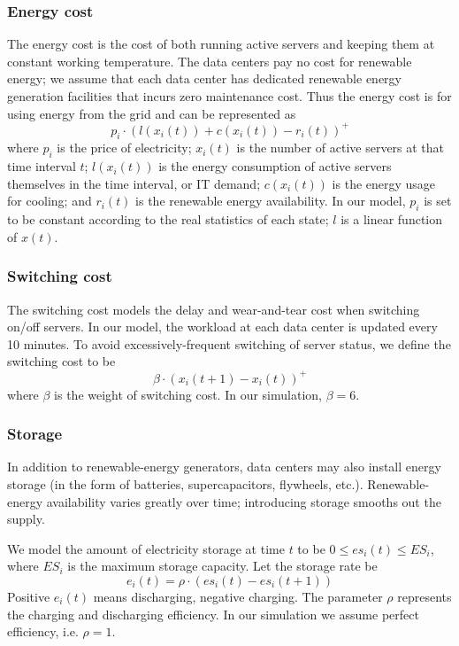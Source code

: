 \documentclass{acm_proc_article-sp}
\begin{document}
\subsubsection{Energy cost}
The energy cost is the cost of both running active servers and keeping them at constant working temperature. The data centers pay no cost for renewable energy; we assume that each data center has dedicated renewable energy generation facilities that incurs zero maintenance cost. Thus the energy cost is for using energy from the grid and can be represented as
\begin{equation}
p_i \cdot (l(x_i(t)) + c(x_i(t)) - r_i(t))^+
\end{equation}
where $p_i$ is the price of electricity; $x_i(t)$ is the number of active servers at that time interval $t$; $l(x_i(t))$ is the energy consumption of active servers themselves in the time interval, or IT demand; $c(x_i(t))$ is the energy usage for cooling; and $r_i(t)$ is the renewable energy availability. In our model, $p_i$ is set to be constant according to the real statistics of each state; $l$ is a linear function of $x(t)$.

\subsubsection{Switching cost}
The switching cost models the delay and wear-and-tear cost when switching on/off servers. In our model, the workload at each data center is updated every 10 minutes. To avoid excessively-frequent switching of server status, we define the switching cost to be
$$\beta \cdot (x_i(t+1) - x_i(t))^+$$
where $\beta$ is the weight of switching cost. In our simulation, $\beta = 6$.

\subsubsection{Storage}
In addition to renewable-energy generators, data centers may also install energy storage (in the form of batteries, supercapacitors, flywheels, etc.). Renewable-energy availability varies greatly over time; introducing storage smooths out the supply.

We model the amount of electricity storage at time $t$ to be $0 \leq es_i(t) \leq ES_i$, where $ES_i$ is the maximum storage capacity. Let the storage rate be
$$e_i(t) = \rho \cdot (es_i(t) - es_i(t+1))$$
Positive $e_i(t)$ means discharging, negative charging. The parameter $\rho$ represents the charging and discharging efficiency. In our simulation we assume perfect efficiency, i.e. $\rho = 1$.
\end{document}

